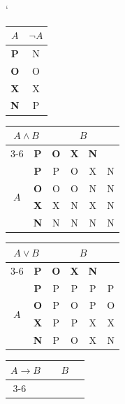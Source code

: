 \documentclass[11pt, a4paper]{article}
\begin{document}
\begin{table}[ht]
    \catcode`
    \begin{center}
        \begin{tabular}{|c|c|} \hline
            $A$ & $\neg A$ \\ \hline
            \textbf{P} & N \\ \hline
            \textbf{O} & O \\ \hline
            \textbf{X} & X \\ \hline
            \textbf{N} & P \\ \hline
        \end{tabular}
        \begin{tabular}{|c|c|c|c|c|c|} \hline
            \multicolumn{2}{|c|}{\multirow{2}{*}{$A \land B$}} & \multicolumn{4}{c|}{\textbf{$B$}} \\ \cline{3-6}
            \multicolumn{2}{|c|}{} & \textbf{P} & \textbf{O} & \textbf{X} & \textbf{N} \\ \hline
            \multirow{4}{*}{\textbf{$A$}} & \textbf{P} & P & O & X & N \\ \cline{2-6}
            & \textbf{O} & O & O & N & N \\ \cline{2-6}
            & \textbf{X} & X & N & X & N \\ \cline{2-6}
            & \textbf{N} & N & N & N & N \\ \hline
        \end{tabular}
        \begin{tabular}{|c|c|c|c|c|c|} \hline
            \multicolumn{2}{|c|}{\multirow{2}{*}{$A \lor B$}} & \multicolumn{4}{c|}{\textbf{$B$}} \\ \cline{3-6}
            \multicolumn{2}{|c|}{} & \textbf{P} & \textbf{O} & \textbf{X} & \textbf{N} \\ \hline
            \multirow{4}{*}{\textbf{$A$}} & \textbf{P} & P & P & P & P \\ \cline{2-6}
            & \textbf{O} & P & O & P & O \\ \cline{2-6}
            & \textbf{X} & P & P & X & X \\ \cline{2-6}
            & \textbf{N} & P & O & X & N \\ \hline
        \end{tabular}
        \begin{tabular}{|c|c|c|c|c|c|} \hline
            \multicolumn{2}{|c|}{\multirow{2}{*}{$A \rightarrow B$}} & \multicolumn{4}{c|}{\textbf{$B$}} \\ \cline{3-6}

\end{tabular}
\end{center}
\end{table}
\end{document}
